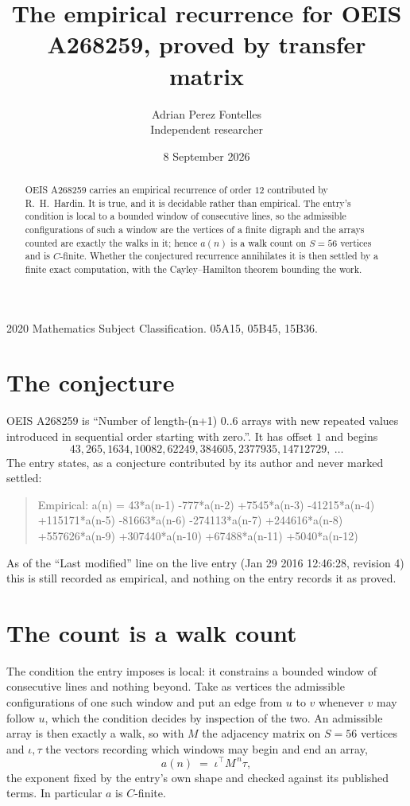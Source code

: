\documentclass[11pt,a4paper]{article}
\title{The empirical recurrence for OEIS A268259, proved by transfer matrix}
\author{Adrian Perez Fontelles\\ \small Independent researcher}
\date{8 September 2026}
\theoremstyle{plain}
\theoremstyle{definition}
\begin{document}
\maketitle

\begin{abstract}
OEIS A268259 carries an empirical recurrence of order $12$ contributed by R.~H.~Hardin. It is
true, and it is decidable rather than empirical. The entry's condition is local to a bounded window of consecutive lines, so
the admissible configurations of such a window are the vertices of a finite digraph and the
arrays counted are exactly the walks in it; hence $a(n)$ is a walk count on $S=56$ vertices
and is $C$-finite. Whether the conjectured recurrence annihilates it is then settled by a
finite exact computation, with the Cayley--Hamilton theorem bounding the work.
\end{abstract}

\noindent\small 2020 Mathematics Subject Classification. 05A15, 05B45, 15B36.\normalsize

\section{The conjecture}

OEIS A268259 is ``Number of length-(n+1) 0..6 arrays with new repeated values introduced in sequential order starting with zero.''. It has offset $1$ and begins
\[
43, 265, 1634, 10082, 62249, 384605, 2377935, 14712729,\ \dots
\]
The entry states, as a conjecture contributed by its author and never marked settled:
\begin{quote}
Empirical: a(n) = 43*a(n-1) -777*a(n-2) +7545*a(n-3) -41215*a(n-4) +115171*a(n-5) -81663*a(n-6) -274113*a(n-7) +244616*a(n-8) +557626*a(n-9) +307440*a(n-10) +67488*a(n-11) +5040*a(n-12)
\end{quote}
As of the ``Last modified'' line on the live entry (Jan 29 2016 12:46:28, revision 4) this is still
recorded as empirical, and nothing on the entry records it as proved.

\section{The count is a walk count}

The condition the entry imposes is local: it constrains a bounded window of consecutive lines and nothing beyond. Take as
vertices the admissible configurations of one such window and put an edge from $u$ to $v$
whenever $v$ may follow $u$, which the condition decides by inspection of the two. An
admissible array is then exactly a walk, so with $M$ the adjacency matrix on $S=56$ vertices
and $\iota,\tau$ the vectors recording which windows may begin and end an array,
\[
a(n)\;=\;\iota^{\!\top}M^{\,n}\tau ,
\]
the exponent fixed by the entry's own shape and checked against its published terms. In
particular $a$ is $C$-finite.
\end{document}
